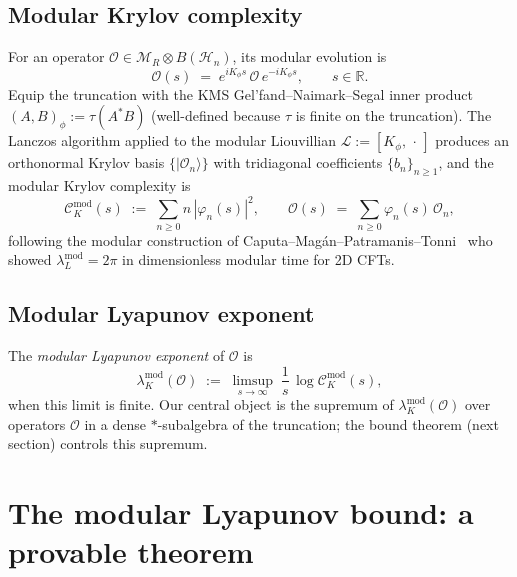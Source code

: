 \documentclass[12pt,a4paper]{article}
\begin{document}
\subsection{Modular Krylov complexity}

For an operator $\mathcal{O} \in \mathcal{M}_R \otimes B(\mathcal{H}_n)$,
its modular evolution is
\begin{equation}
  \mathcal{O}(s) \;=\; e^{i K_\phi s}\,\mathcal{O}\,e^{-i K_\phi s},
  \qquad s \in \mathbb{R}.
  \label{eq:modular-flow}
\end{equation}
Equip the truncation with the KMS Gel'fand--Naimark--Segal inner product
$(A,B)_\phi := \tau(A^* B)$ (well-defined because $\tau$ is finite on
the truncation).
The Lanczos algorithm applied to the modular Liouvillian
$\mathcal{L} := [K_\phi,\,\cdot\,]$ produces an orthonormal Krylov
basis $\{|\mathcal{O}_n\rangle\}$ with tridiagonal coefficients
$\{b_n\}_{n\ge 1}$, and the modular Krylov complexity is
\begin{equation}
  \mathcal{C}_K^{\mathrm{mod}}(s)
  \;:=\;
  \sum_{n\ge 0} n\,|\varphi_n(s)|^2,
  \qquad
  \mathcal{O}(s) \;=\; \sum_{n\ge 0}\varphi_n(s)\,\mathcal{O}_n,
\end{equation}
following the modular construction of Caputa--Mag\'{a}n--Patramanis--Tonni~\cite{Caputa2024}
who showed $\lambda^{\mathrm{mod}}_L = 2\pi$ in dimensionless modular
time for 2D CFTs.

\subsection{Modular Lyapunov exponent}

The \emph{modular Lyapunov exponent} of $\mathcal{O}$ is
\begin{equation}
  \lambda_K^{\mathrm{mod}}(\mathcal{O})
  \;:=\;
  \limsup_{s\to\infty}\;\frac{1}{s}\,
  \log \mathcal{C}_K^{\mathrm{mod}}(s),
\end{equation}
when this limit is finite.
Our central object is the supremum of $\lambda_K^{\mathrm{mod}}(\mathcal{O})$
over operators $\mathcal{O}$ in a dense $\ast$-subalgebra of the
truncation; the bound theorem (next section) controls this supremum.

\section{The modular Lyapunov bound: a provable theorem}
\label{sec:bound}
\end{document}
